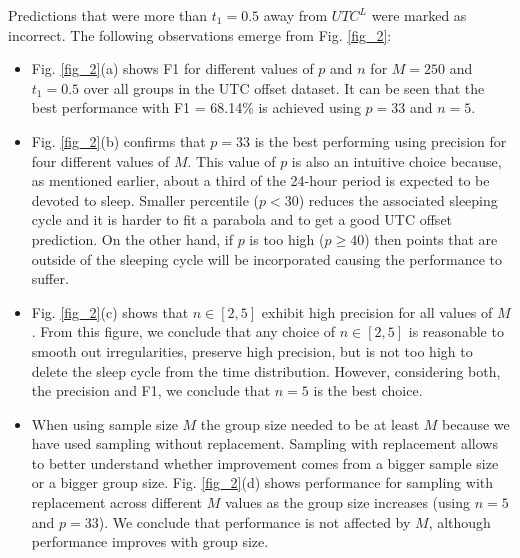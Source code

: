Predictions that were more than $t_1=0.5$ away from $UTC^L$ were marked as incorrect. The following observations emerge from Fig. \ref{fig_2}:

\begin{itemize}
    \item 
Fig. \ref{fig_2}(a) shows F1 for different values of $p$ and $n$ for $M = 250$ and $t_1=0.5$ over all groups in the UTC offset dataset. It can be seen that the best performance with F1 = 68.14\% is achieved using $p=33$ and $n=5$.  
\item
Fig. \ref{fig_2}(b) confirms that $p=33$ is the best performing using precision for four different values of $M$. This value of $p$ is also an intuitive choice because, as mentioned earlier, about a third of the 24-hour period is expected to be devoted to sleep. Smaller percentile ($p<30$) reduces the associated sleeping cycle and it is harder to fit a parabola and to get a good UTC offset prediction. On the other hand, if $p$ is too high ($p\geq40$) then points that are outside of the sleeping cycle will be incorporated causing the performance to suffer. 
\item
Fig. \ref{fig_2}(c) shows that $n \in [2,5]$  exhibit high precision for all values of $M$. From this figure, we conclude that any choice of $n\in [2,5]$ is reasonable to smooth out irregularities, preserve high precision, but is not too high to delete the sleep cycle from the time distribution. However, considering both, the precision and F1,  we conclude that $n=5$ is the best choice. 
\item
When using sample size $M$ the group size needed to be at least $M$ because we have used sampling without replacement. Sampling with replacement allows to better understand whether improvement comes from a bigger sample size or a bigger group size. 
Fig. \ref{fig_2}(d) shows performance for sampling with replacement across different $M$ values as the group size increases (using $n=5$ and $p=33$). We conclude that 
performance is not affected by $M$,  although performance improves with group size.
\end{itemize}

